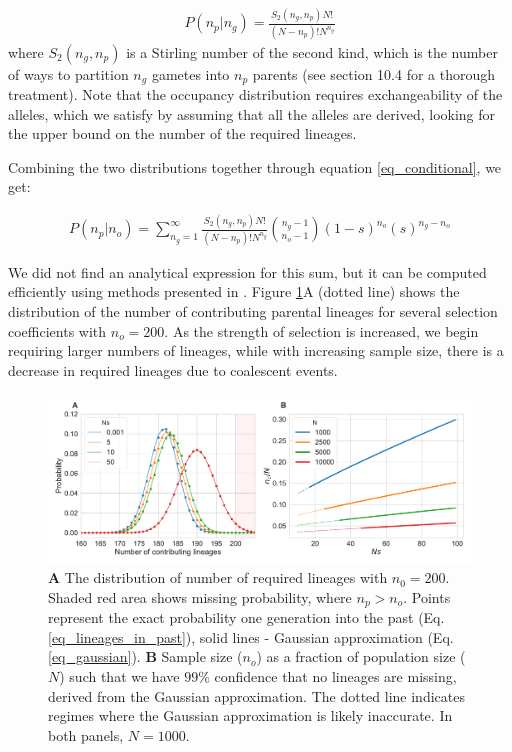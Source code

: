 \documentclass[review]{elsarticle}
\begin{document}
\begin{equation}
  \begin{aligned}
    \label{eq_occupancy}
    P(n_p|n_g) = \frac{S_2(n_g,n_p) N!}{(N-n_p)! N^{n_g}}
  \end{aligned}
\end{equation}
where $S_2(n_g,n_p)$ is a Stirling number of the second kind, which is the number of ways to
partition $n_g$ gametes into $n_p$ parents (see \cite{JohnsonEtAl2005} section 10.4 for a thorough
treatment).
Note that the occupancy distribution requires exchangeability of the alleles, which we satisfy by
assuming that all the alleles are derived, looking for the upper bound on the number of the
required lineages.

Combining the two distributions together through equation \ref{eq_conditional}, we get:

\begin{equation}
  \begin{aligned}
    \label{eq_lineages_in_past}
    P(n_p|n_o) = \sum_{n_g=1}^{\infty} \frac{S_2(n_g,n_p) N!}{(N-n_p)! N^{n_g}} \binom{n_g-1}{n_o-1}(1-s)^{n_o}(s)^{n_g-n_o}
  \end{aligned}
\end{equation}

We did not find an analytical expression for this sum, but it can be computed
efficiently using methods presented in \citep{ONeill2019}. Figure \ref{fig_combined}A (dotted line) shows
the distribution of the number of contributing parental lineages for several selection coefficients
with $n_o=200$.
As the strength of selection
is increased, we begin requiring larger numbers of lineages, while with increasing sample size,
there is a decrease in required lineages due to coalescent events.

\begin{figure}
  \centering
  \includegraphics[width=\textwidth]{fig/combined.pdf}
  \caption{\textbf{A} The distribution of number of required lineages with $n_0=200$. Shaded
    red area shows missing probability, where $n_p > n_o$. Points represent the exact probability one
    generation into the past (Eq. \ref{eq_lineages_in_past}), solid lines - Gaussian approximation
    (Eq. \ref{eq_gaussian}). \textbf{B} Sample size ($n_o$) as a fraction of population size ($N$)
    such that we have $99\%$ confidence that no lineages are missing, derived from the Gaussian
    approximation. The dotted line indicates regimes where the Gaussian approximation is likely inaccurate. 
     In both panels, $N=1000$.}
  \label{fig_combined}
\end{figure}
\end{document}
